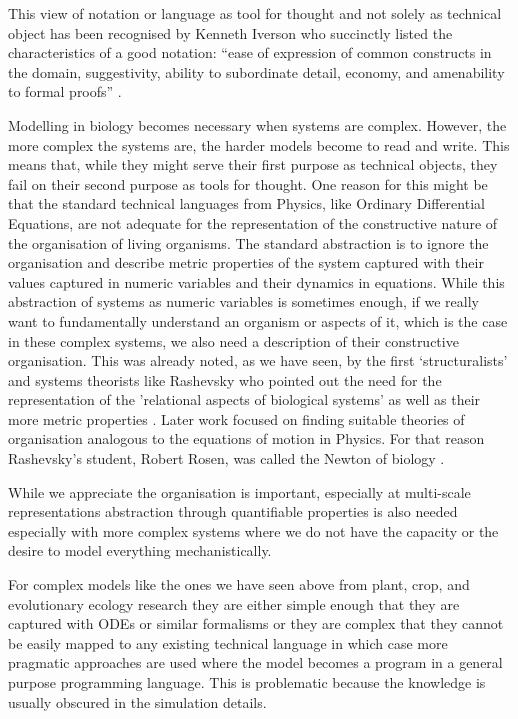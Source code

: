 This view of notation or language as tool for thought and not solely as
technical object has been recognised by Kenneth Iverson who succinctly listed the
characteristics of a good notation: ``ease of expression of common constructs
in the domain, suggestivity, ability to subordinate detail, economy, and
amenability to formal proofs'' \citep{iverson2007notation}.

Modelling in biology becomes necessary when systems are complex. However, the
more complex the systems are, the harder models become to read and write. This
means that, while they might serve their first purpose as technical objects,
they fail on their second purpose as tools for thought. One reason for this
might be that the standard technical languages from Physics, like Ordinary
Differential Equations, are not adequate for the representation of the
constructive nature of the organisation of living organisms. The standard
abstraction is to ignore the organisation and describe metric properties of the
system captured with their values captured in numeric variables and their
dynamics in equations. While this abstraction of systems as numeric variables is
sometimes enough, if we really want to fundamentally understand an organism or
aspects of it, which is the case in these complex systems, we also need a
description of their constructive organisation. This was already noted, as we
have seen, by the first `structuralists' and systems theorists like Rashevsky
who pointed out the need for the representation of the 'relational aspects of
biological systems' as well as their more metric properties
\citet{rashevsky_topology_1954}. Later work focused on finding suitable theories
of organisation analogous to the equations of motion in Physics. For that
reason Rashevsky's student, Robert Rosen, was called the Newton of biology
\citep{mikulecky2001robert}.

While we appreciate the organisation is important, especially at multi-scale
representations abstraction through quantifiable properties is also needed
especially with more complex systems where we do not have the capacity or the
desire to model everything mechanistically.

For complex models like the ones we have seen above from plant, crop, and
evolutionary ecology research they are either simple enough that they are
captured with ODEs or similar formalisms or they are complex that they cannot be
easily mapped to any existing technical language in which case more pragmatic
approaches are used where the model becomes a program in a general purpose
programming language. This is problematic because the knowledge is usually
obscured in the simulation details.

